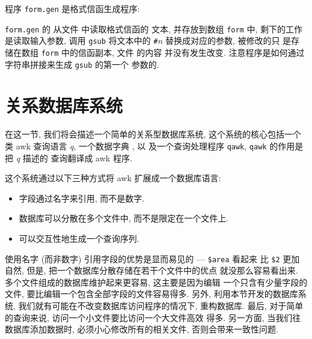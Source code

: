 程序 \verb'form.gen' 是格式信函生成程序:

\verb'form.gen' 的 \BEGIN 从文件  中读取格式信函的
文本, 并存放到数组 \verb'form' 中, 剩下的工作是读取输入参数, 调用
\verb'gsub' 将文本中的 \verb'#'\textit{n} 替换成对应的参数, 被修改的只
是存储在数组 \verb'form' 中的信函副本, 文件  的内容
并没有发生改变. 注意程序是如何通过字符串拼接来生成 \verb'gsub' 的第一个
参数的.

\section{关系数据库系统}
\label{sec:a_relational_database_system}

在这一节, 我们将会描述一个简单的关系型数据库系统, 这个系统的核心包括一个
类 awk 查询语言 \textit{q}, 一个数据字典 , 以
及一个查询处理程序 \verb'qawk', \verb'qawk' 的作用是把 \textit{q} 描述的
查询翻译成 awk 程序.

这个系统通过以下三种方式将 awk 扩展成一个数据库语言:
\begin{itemize}
    \item 字段通过名字来引用, 而不是数字.
    \item 数据库可以分散在多个文件中, 而不是限定在一个文件上.
    \item 可以交互性地生成一个查询序列.
\end{itemize}
使用名字 (而非数字) 引用字段的优势是显而易见的 --- \verb'$area' 看起来
比 \verb'$2' 更加自然, 但是, 把一个数据库分散存储在若干个文件中的优点
就没那么容易看出来. 多个文件组成的数据库维护起来更容易, 这主要是因为编辑
一个只含有少量字段的文件, 要比编辑一个包含全部字段的文件容易得多. 另外,
利用本节开发的数据库系统, 我们就有可能在不改变数据库访问程序的情况下,
重构数据库. 最后, 对于简单的查询来说, 访问一个小文件要比访问一个大文件高效
得多. 另一方面, 当我们往数据库添加数据时, 必须小心修改所有的相关文件,
否则会带来一致性问题.

